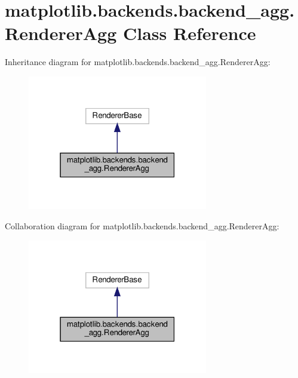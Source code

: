 \hypertarget{classmatplotlib_1_1backends_1_1backend__agg_1_1RendererAgg}{}\section{matplotlib.\+backends.\+backend\+\_\+agg.\+Renderer\+Agg Class Reference}
\label{classmatplotlib_1_1backends_1_1backend__agg_1_1RendererAgg}


Inheritance diagram for matplotlib.\+backends.\+backend\+\_\+agg.\+Renderer\+Agg\+:
\nopagebreak
\begin{figure}[H]
\begin{center}
\leavevmode
\includegraphics[width=223pt]{classmatplotlib_1_1backends_1_1backend__agg_1_1RendererAgg__inherit__graph}
\end{center}
\end{figure}


Collaboration diagram for matplotlib.\+backends.\+backend\+\_\+agg.\+Renderer\+Agg\+:
\nopagebreak
\begin{figure}[H]
\begin{center}
\leavevmode
\includegraphics[width=223pt]{classmatplotlib_1_1backends_1_1backend__agg_1_1RendererAgg__coll__graph}
\end{center}
\end{figure}
